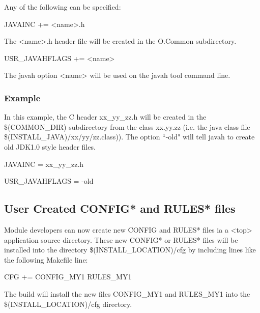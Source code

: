 Any of the following can be specified:

\begin{description}

\item {}JAVAINC += \textless{}name\textgreater{}.h

The \textless{}name\textgreater{}.h header file will be created in the O.Common subdirectory.

\item {}USR\_JAVAHFLAGS += \textless{}name\textgreater{}

The javah option \textless{}name\textgreater{} will be used on the javah tool command line.

\end{description}

\subsubsection{Example}

In this example, the C header xx\_yy\_zz.h will be created in the \$(COMMON\_DIR) subdirectory from the class xx.yy.zz 
(i.e. the java class file \$(INSTALL\_JAVA)/xx/yy/zz.class)). The option ``-old" will tell javah to create old JDK1.0 style 
header files.

\begin{description}\item JAVAINC = xx\_yy\_zz.h

\item USR\_JAVAHFLAGS = -old

\end{description}\subsection{User Created CONFIG* and RULES* files}

Module developers can now create new CONFIG and RULES* files ia a \textless{}top\textgreater{} application source directory. These new 
CONFIG* or RULES* files will be installed into the directory \$(INSTALL\_LOCATION)/cfg by including lines like the 
following Makefile line:

\begin{description}\item       {}CFG += CONFIG\_MY1 RULES\_MY1

\end{description}The build will install the new files CONFIG\_MY1 and RULES\_MY1 into the \$(INSTALL\_LOCATION)/cfg directory.

